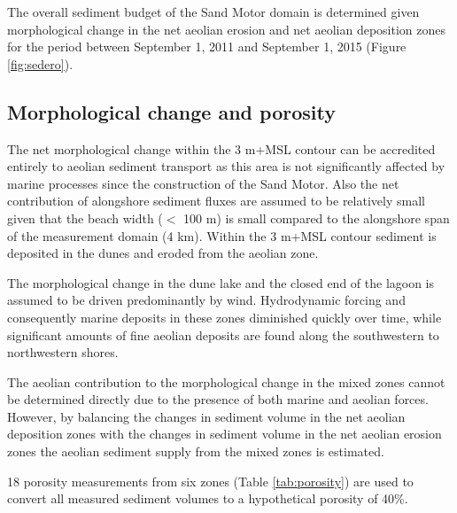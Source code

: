 The overall sediment budget of the Sand Motor domain is determined
given morphological change in the net aeolian erosion and net aeolian
deposition zones for the period between September 1, 2011 and
September 1, 2015 (Figure \ref{fig:sedero}).

\subsection{Morphological change and porosity}

The net morphological change within the 3 m+MSL contour can be
accredited entirely to aeolian sediment transport as this area is not
significantly affected by marine processes since the construction of
the Sand Motor. Also the net contribution of alongshore sediment
fluxes are assumed to be relatively small given that the beach width
($<$ 100 m) is small compared to the alongshore span of the
measurement domain (4 km). Within the 3 m+MSL contour sediment is
deposited in the dunes and eroded from the aeolian zone.

The morphological change in the dune lake and the closed end of the
lagoon is assumed to be driven predominantly by wind. Hydrodynamic
forcing and consequently marine deposits in these zones diminished
quickly over time, while significant amounts of fine aeolian deposits
are found along the southwestern to northwestern shores.

The aeolian contribution to the morphological change in the mixed
zones cannot be determined directly due to the presence of both marine
and aeolian forces. However, by balancing the changes in sediment
volume in the net aeolian deposition zones with the changes in
sediment volume in the net aeolian erosion zones the aeolian sediment
supply from the mixed zones is estimated.

18 porosity measurements from six zones (Table \ref{tab:porosity}) are
used to convert all measured sediment volumes to a hypothetical
porosity of 40\%.

